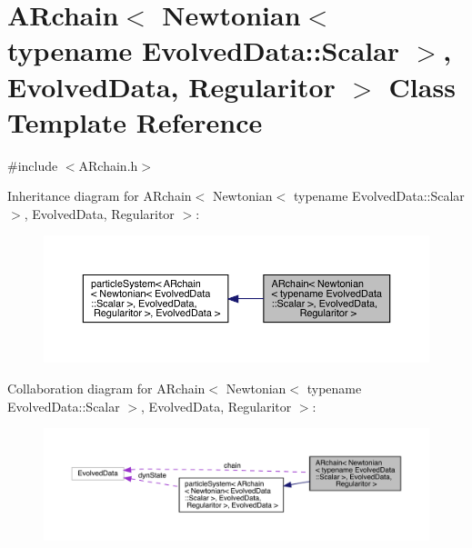\hypertarget{class_a_rchain_3_01_newtonian_3_01typename_01_evolved_data_1_1_scalar_01_4_00_01_evolved_data_00_01_regularitor_01_4}{}\section{A\+Rchain$<$ Newtonian$<$ typename Evolved\+Data\+:\+:Scalar $>$, Evolved\+Data, Regularitor $>$ Class Template Reference}
\label{class_a_rchain_3_01_newtonian_3_01typename_01_evolved_data_1_1_scalar_01_4_00_01_evolved_data_00_01_regularitor_01_4}


{\ttfamily \#include $<$A\+Rchain.\+h$>$}



Inheritance diagram for A\+Rchain$<$ Newtonian$<$ typename Evolved\+Data\+:\+:Scalar $>$, Evolved\+Data, Regularitor $>$\+:\nopagebreak
\begin{figure}[H]
\begin{center}
\leavevmode
\includegraphics[width=350pt]{class_a_rchain_3_01_newtonian_3_01typename_01_evolved_data_1_1_scalar_01_4_00_01_evolved_data_009697bd28ff0e21ae1fe098221d830f5f}
\end{center}
\end{figure}


Collaboration diagram for A\+Rchain$<$ Newtonian$<$ typename Evolved\+Data\+:\+:Scalar $>$, Evolved\+Data, Regularitor $>$\+:
\nopagebreak
\begin{figure}[H]
\begin{center}
\leavevmode
\includegraphics[width=350pt]{class_a_rchain_3_01_newtonian_3_01typename_01_evolved_data_1_1_scalar_01_4_00_01_evolved_data_0008f198c2eb8c667ccc6c16f5130b7c81}
\end{center}
\end{figure}

